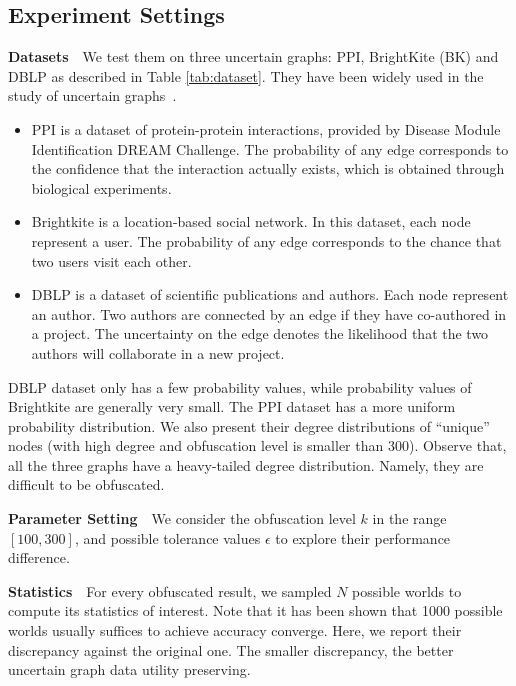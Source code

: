 \subsection{Experiment Settings}



\textbf{Datasets}~~We test them on three uncertain graphs: PPI, BrightKite (BK) and DBLP as described in Table \ref{tab:dataset}. They have been widely used in the study of uncertain graphs~\cite{Zhao_Detecting_2014,Potamias_K_2010,Jin_Distance_2011}. 

\begin{itemize}
	\item{PPI is a dataset of protein-protein interactions, provided by Disease Module Identification DREAM Challenge. The probability of any edge corresponds to the confidence that the interaction actually exists, which is obtained through biological experiments.}
	\item{Brightkite is a location-based social network. In this dataset, each node represent a user. The probability of any edge corresponds to the chance that two users visit each other.}
	\item{DBLP is a dataset of scientific publications and authors. Each node represent an author. Two authors are connected by an edge if they have co-authored in a project. The uncertainty on the edge denotes the likelihood that the two authors will collaborate in a new project.}
\end{itemize}
DBLP dataset only has a few probability values, while probability values of Brightkite  are generally very small. The PPI dataset has a more uniform probability distribution. We also present their degree distributions of “unique” nodes (with high degree and obfuscation level is smaller than 300). Observe that, all the three graphs have a heavy-tailed degree distribution. Namely, they are difficult to be obfuscated.

\textbf{Parameter Setting}~~We consider the obfuscation level $k$ in the range $[100,300]$, and possible tolerance values $\epsilon$ to explore their performance difference. 

\textbf{Statistics}~~For every obfuscated result, we sampled $N$ possible worlds to compute its statistics of interest. Note that it has been shown that 1000 possible worlds usually suffices to achieve accuracy converge.  Here, we report their discrepancy against the original one. The smaller discrepancy, the better uncertain graph data utility preserving.


